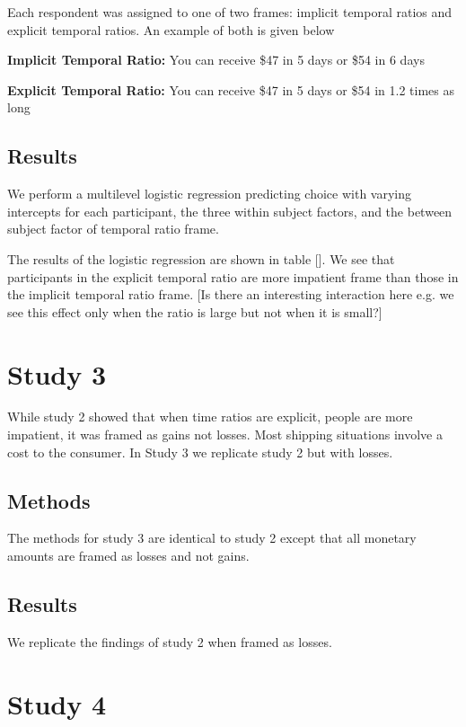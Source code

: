 \documentclass[]{article}
\begin{document}
Each respondent was assigned to one of two frames: implicit temporal ratios and explicit temporal ratios. An example of both is given below

\textbf{Implicit Temporal Ratio: } You can receive \$47 in 5 days or \$54 in 6 days

\textbf{Explicit Temporal Ratio: } You can receive \$47 in 5 days or \$54 in 1.2 times as long

\subsection{Results}

We perform a multilevel logistic regression predicting choice with varying intercepts for each participant, the three within subject factors, and the between subject factor of temporal ratio frame. 

The results of the logistic regression are shown in table []. We see that participants in the explicit temporal ratio are more impatient frame than those in the implicit temporal ratio frame. [Is there an interesting interaction here e.g. we see this effect only when the ratio is large but not when it is small?]


\section{Study 3}

While study 2 showed that when time ratios are explicit, people are more impatient, it was framed as gains not losses.
Most shipping situations involve a cost to the consumer. 
In Study 3 we replicate study 2 but with losses.

\subsection{Methods}

The methods for study 3 are identical to study 2 except that all monetary amounts are framed as losses and not gains. 

\subsection{Results}

We replicate the findings of study 2 when framed as losses. 

\section{Study 4}
\end{document}
